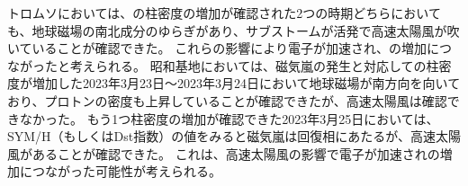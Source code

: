 トロムソにおいては、の柱密度の増加が確認された2つの時期どちらにおいても、地球磁場の南北成分のゆらぎがあり、サブストームが活発で高速太陽風が吹いていることが確認できた。
これらの影響により電子が加速され、の増加につながったと考えられる。
昭和基地においては、磁気嵐の発生と対応しての柱密度が増加した2023年3月23日〜2023年3月24日において地球磁場が南方向を向いており、プロトンの密度も上昇していることが確認できたが、高速太陽風は確認できなかった。
もう1つ柱密度の増加が確認できた2023年3月25日においては、SYM/H（もしくはDst指数）の値をみると磁気嵐は回復相にあたるが、高速太陽風があることが確認できた。
これは、高速太陽風の影響で電子が加速されの増加につながった可能性が考えられる。
